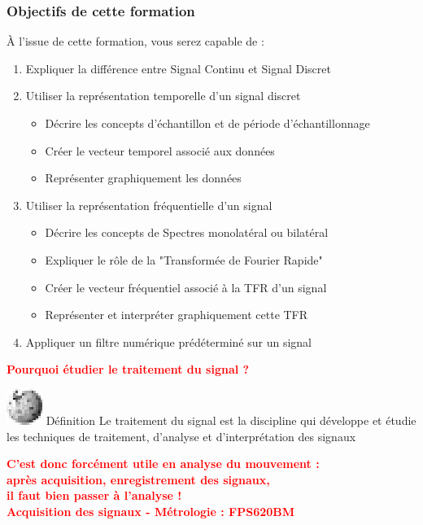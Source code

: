 \documentclass[a4paper,11pt]{beamer}
\begin{document}
\begin{frame}[plain]
\frametitle{Objectifs de cette formation}
\center
À l'issue de cette formation, vous serez capable de :
    \vspace{0.25cm}

\begin{enumerate}
    \item Expliquer la différence entre Signal Continu et Signal Discret
    \item Utiliser la représentation temporelle d'un signal discret
 		\begin{itemize}
 		  \item Décrire les concepts d'échantillon et de période d'échantillonnage
 		  \item Créer le vecteur temporel associé aux données
 		  \item Représenter graphiquement les données
 		\end{itemize}
  \item Utiliser la représentation fréquentielle d'un signal
  	    \begin{itemize}
  	      \item Décrire les concepts de Spectres monolatéral ou bilatéral
  	      \item Expliquer le rôle de la "Transformée de Fourier Rapide"
  	      \item Créer le vecteur fréquentiel associé à la TFR d'un signal
 		  \item Représenter et interpréter graphiquement cette TFR
 		\end{itemize}
 \item Appliquer un filtre numérique prédéterminé sur un signal
\end{enumerate}
\end{frame}

\begin{frame}
	\begin{center}
		\textbf{\textcolor{red}{Pourquoi étudier le traitement du signal ?}}
	\end{center}
	\pause
	\begin{block}{\includegraphics[scale=0.45]{images/Logo_Wikipedia.eps}
	\enspace Définition} Le traitement du signal est la discipline qui développe et
	étudie les techniques de traitement, d'analyse et d'interprétation des signaux
	\end{block}
	\pause
	\begin{center}
		\textbf{\textcolor{red}{C'est donc forcément utile en analyse du mouvement :
		\\
		\smallbreak 
		après acquisition, enregistrement des signaux,\\ il faut bien
		passer à l'analyse !\\
		\bigbreak
		 Acquisition des signaux - Métrologie : FPS620BM}}
	\end{center}
\end{frame}
\end{document}
